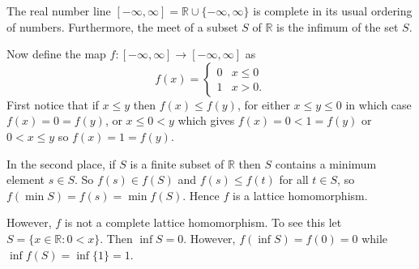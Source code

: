 \documentclass[12pt]{article}
\providecommand{\union}{\cup}
\begin{document}
The real number line $[-\infty,\infty]=\mathbb{R}\union\{-\infty,\infty\}$ is complete 
in its usual ordering of numbers.  Furthermore, the meet of a subset $S$ of $\mathbb{R}$ is 
the infimum of the set $S$.

Now define the map $f:[-\infty,\infty]\to [-\infty,\infty]$ as
\[f(x)=\left\{\begin{array}{cc} 0 & x\leq 0\\ 1 & x>0.\end{array}\right.\]
First notice that if $x\leq y$ then $f(x)\leq f(y)$, for either $x\leq y\leq 0$ in
which case $f(x)=0=f(y)$, or $x\leq 0< y$ which gives $f(x)=0<1=f(y)$ or
$0<x\leq y$ so $f(x)=1=f(y)$.

In the second place, if $S$ is a finite subset of $\mathbb{R}$ then $S$ contains 
a minimum element $s\in S$.  So $f(s)\in f(S)$ and $f(s)\leq f(t)$ for all $t\in S$, 
so $f(\min S)=f(s)=\min f(S)$.  Hence $f$ is a lattice homomorphism.

However, $f$ is not a complete lattice homomorphism.  To see this let
$S=\{x\in \mathbb{R}: 0< x\}$.  Then $\inf S=0$.  However,
$f(\inf S)=f(0)=0$ while $\inf f(S)=\inf \{1\}=1$.  

\end{document}
